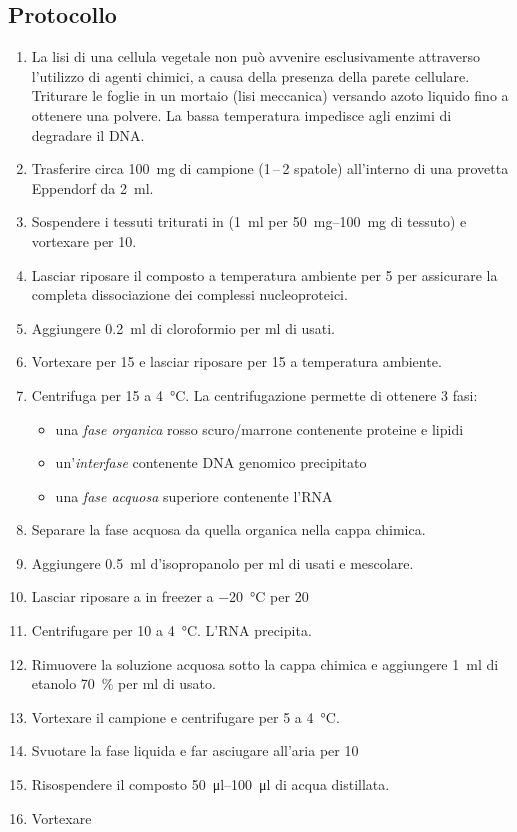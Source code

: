 \subsection{Protocollo}
\begin{enumerate}
	\item La lisi di una cellula vegetale non può avvenire esclusivamente attraverso l’utilizzo di agenti chimici, a causa della presenza della parete cellulare. Triturare le foglie in un mortaio (lisi meccanica) versando azoto liquido fino a ottenere una polvere. La bassa temperatura impedisce agli enzimi di degradare il DNA.
	\item Trasferire circa \qty{100}{\mg} di campione (1\,--\,2 spatole) all’interno di una provetta \foreignlanguage{german}{Eppendorf} da \qty{2}{\ml}.
	\item Sospendere i tessuti triturati in \trizol (\qty{1}{ml} per \qtyrange{50}{100}{mg} di tessuto) e vortexare per \qty{10}{\sec}.
	\item Lasciar riposare il composto a temperatura ambiente per \qty{5}{\min} per assicurare la completa dissociazione dei complessi nucleoproteici.
	\item Aggiungere \qty{0.2}{\ml} di cloroformio per ml di \trizol usati.
	\item Vortexare per \qty{15}{\sec} e lasciar riposare per \qty{15}{\min} a temperatura ambiente.
	\item Centrifuga per \qty{15}{\min} a \qty{4}{\celsius}. La centrifugazione permette di ottenere 3 fasi: 
	\begin{itemize}
		\item una \emph{fase organica} rosso scuro/marrone contenente proteine e lipidi
		\item un’\emph{interfase} contenente DNA genomico precipitato
		\item una \emph{fase acquosa} superiore contenente l’RNA
	\end{itemize}
	\item Separare la fase acquosa da quella organica nella cappa chimica.
	\item Aggiungere \qty{0.5}{ml} d'isopropanolo per \unit{\ml} di \trizol usati e mescolare.
	\item Lasciar riposare a in freezer a \qty{-20}{\celsius} per \qty{20}{\min}
	\item Centrifugare per \qty{10}{\min} a \qty{4}{\celsius}. L’RNA precipita.
	\item Rimuovere la soluzione acquosa sotto la cappa chimica e aggiungere \qty{1}{ml} di etanolo \qty{70}{\percent} per \unit{\ml} di \trizol usato.
	\item Vortexare il campione e centrifugare per \qty{5}{\min} a \qty{4}{\celsius}.
	\item Svuotare la fase liquida e far asciugare all’aria per \qty{10}{\min}
	\item Risospendere il composto \qtyrange{50}{100}{\micro\litre} di acqua distillata.
	\item Vortexare	
\end{enumerate}


